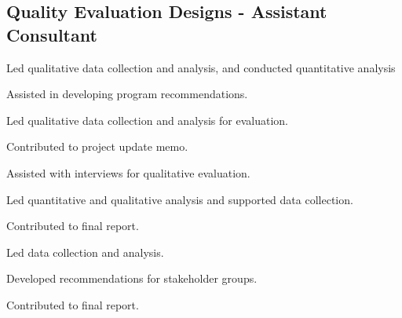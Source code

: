 \subsection{Quality Evaluation Designs - Assistant Consultant}
\begin{cvtable}
        {\color{cvsectioncolor}{Penn State Acoustics Program}}
        {}
        {\begin{tightitemize}
            \item Led qualitative data collection and analysis, and conducted quantitative analysis
            \item Assisted in developing program recommendations.
        \end{tightitemize}}
        {\color{cvsectioncolor}{RIEF - Virtual Community of Practice}}
        {}
        {\begin{tightitemize}
            \item Led qualitative data collection and analysis for evaluation.
            \item Contributed to project update memo.
        \end{tightitemize}}
    \cvitem{}
        {\color{cvsectioncolor}{IGE - Personalized Learning Module for Graduate STEM Education}}
        {}
        {\begin{tightitemize}
            \item Assisted with interviews for qualitative evaluation.
        \end{tightitemize}}  
        {\color{cvsectioncolor}{Engineering Education and Research Centers}}
        {}
        {\begin{tightitemize}
            \item Led quantitative and qualitative analysis and supported data collection.
            \item Contributed to final report.
        \end{tightitemize}}
    \cvitem{}
        {\color{cvsectioncolor}{Capacity Building for Research at Minority Serving Institutions}}
        {}
        {\begin{tightitemize}
            \item Led data collection and analysis.
            \item Developed recommendations for stakeholder groups.
            \item Contributed to final report.
        \end{tightitemize}}
\end{cvtable}